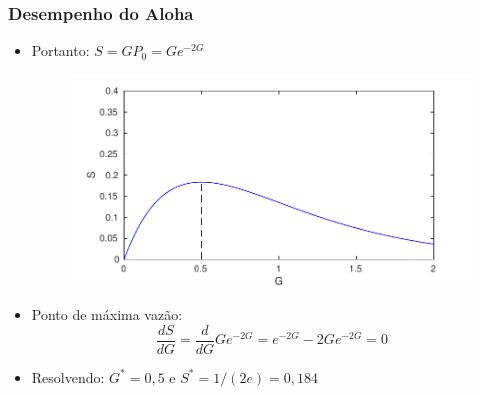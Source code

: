 \begin{frame}
	\frametitle{Desempenho do Aloha}

	\begin{itemize}
		\item Portanto: $S = GP_0 = Ge^{-2G}$
		\begin{figure}[t]
			\begin{center}
				\includegraphics[width=0.55\columnwidth]{figs/aloha-cap}
			\end{center}
		\end{figure}
		\item Ponto de máxima vazão:
		\begin{equation*}
		    \frac{dS}{dG} = \frac{d}{dG} Ge^{-2G} = e^{-2G} - 2Ge^{-2G} = 0
		\end{equation*}
		\item Resolvendo: $G^* = 0,5$ e $S^* = 1/(2e) = 0,184$
	\end{itemize}
	
\end{frame}

